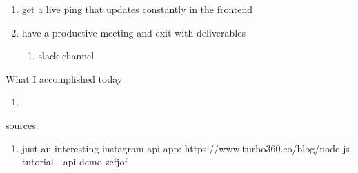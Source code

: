 \begin{enumerate}
	\item get a live ping that updates constantly in the frontend
	\item have a productive meeting and exit with deliverables
		\begin{enumerate}
			\item slack channel
		\end{enumerate}
\end{enumerate}

What I accomplished today

\begin{enumerate}
	\item 
\end{enumerate}

sources:

\begin{enumerate}
	\item just an interesting instagram api app: https://www.turbo360.co/blog/node-js-tutorial---api-demo-zcfjof
\end{enumerate}


